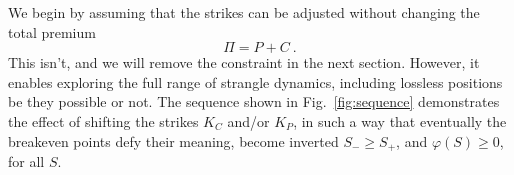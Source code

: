 \documentclass[aps,reprint]{revtex4-2}
\begin{document}
We begin by assuming that the strikes can be adjusted without changing the total premium 
\begin{equation}
\Pi = P + C~.
\end{equation}
This isn't, and we will remove the constraint in the next section. However, it enables 
exploring the full range of strangle dynamics, including lossless positions be they possible or not.
The sequence shown in Fig.~\ref{fig:sequence} demonstrates the effect of shifting the strikes $K_C$ and/or $K_P$,  in such a way that eventually the breakeven points defy their meaning, become inverted $S_- \geq S_+$, and $\varphi(S) \geq 0$, for all $S$.
\end{document}
